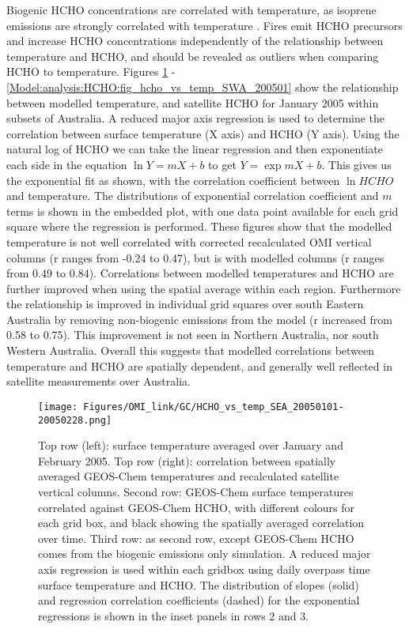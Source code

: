  Biogenic HCHO concentrations are correlated with temperature, as isoprene emissions are strongly correlated with temperature \parencite{Palmer2006, Zhu2013_poster, Surl2018}.
  Fires emit HCHO precursors and increase HCHO concentrations independently of the relationship between temperature and HCHO, and should be revealed as outliers when comparing HCHO to temperature.
  Figures \ref{Model:analysis:HCHO:fig_hcho_vs_temp_SEA_200501} - \ref{Model:analysis:HCHO:fig_hcho_vs_temp_SWA_200501} show the relationship between modelled temperature, and satellite HCHO for January 2005 within subsets of Australia.
  A reduced major axis regression is used to determine the correlation between surface temperature (X axis) and HCHO (Y axis).
  Using the natural log of HCHO we can take the linear regression and then exponentiate each side in the equation $\ln{Y} = m{X}+b$ to get ${Y} = \exp{m{X}+b}$. 
  This gives us the exponential fit as shown, with the correlation coefficient between $\ln{HCHO}$ and temperature.
  The distributions of exponential correlation coefficient and $m$ terms is shown in the embedded plot, with one data point available for each grid square where the regression is performed.
  These figures show that the modelled temperature is not well correlated with corrected recalculated OMI vertical columns (r ranges from -0.24 to 0.47), but is with modelled columns (r ranges from 0.49 to 0.84).
  Correlations between modelled temperatures and HCHO are further improved when using the spatial average within each region.
  Furthermore the relationship is improved in individual grid squares over south Eastern Australia by removing non-biogenic emissions from the model (r increased from 0.58 to 0.75).
  This improvement is not seen in Northern Australia, nor south Western Australia.
  Overall this suggests that modelled correlations between temperature and HCHO are spatially dependent, and generally well reflected in satellite measurements over Australia.
  
  \begin{figure}
    \texttt{[image: Figures/OMI\_link/GC/HCHO\_vs\_temp\_SEA\_20050101-20050228.png]}
    \caption{%
      Top row (left): surface temperature averaged over January and February 2005.
      Top row (right): correlation between spatially averaged GEOS-Chem temperatures and recalculated satellite vertical columns.
      Second row: GEOS-Chem surface temperatures correlated against GEOS-Chem HCHO, with different colours for each grid box, and black showing the spatially averaged correlation over time.
      Third row: as second row, except GEOS-Chem HCHO comes from the biogenic emissions only simulation.
      A reduced major axis regression is used within each gridbox using daily overpass time surface temperature and HCHO.
      The distribution of slopes (solid) and regression correlation coefficients (dashed) for the exponential regressions is shown in the inset panels in rows 2 and 3.
    }
    \label{Model:analysis:HCHO:fig_hcho_vs_temp_SEA_200501}
  \end{figure}
  
